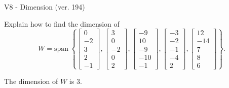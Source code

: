 \begin{exercise}
  \begin{exerciseTitle}V8 - Dimension (ver. 194)\end{exerciseTitle}
  \begin{exerciseStatement}
    Explain how to find the dimension of 
\[W=\mathrm{span}\ \left\{\left[\begin{array}{r}
0 \\
-2 \\
3 \\
2 \\
-1
\end{array}\right] , \left[\begin{array}{r}
3 \\
0 \\
-2 \\
0 \\
2
\end{array}\right] , \left[\begin{array}{r}
-9 \\
10 \\
-9 \\
-10 \\
-1
\end{array}\right] , \left[\begin{array}{r}
-3 \\
-2 \\
-1 \\
-4 \\
2
\end{array}\right] , \left[\begin{array}{r}
12 \\
-14 \\
7 \\
8 \\
6
\end{array}\right]\right\}.\]



  \end{exerciseStatement}
  \begin{exerciseAnswer}
   The dimension of \(W\) is  \(3\).
  


  \end{exerciseAnswer}
\end{exercise}
